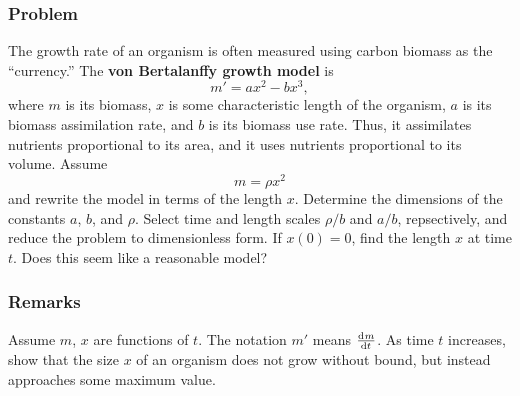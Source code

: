 \documentclass[12pt]{article}
\begin{document}
\subsubsection*{Problem}
The growth rate of an organism is often measured using carbon biomass as the
``currency.'' The \textbf{von Bertalanffy growth model} is
\begin{equation}
  \label{eq:growth-model}
  m' = ax^2 - bx^3,
\end{equation}
where $m$ is its biomass, $x$ is some characteristic length of the organism, $a$
is its biomass assimilation rate, and $b$ is its biomass use rate. Thus, it
assimilates nutrients proportional to its area, and it uses nutrients
proportional to its volume. Assume
\begin{equation}
  \label{eq:biomass-model}
  m=\rho x^2
\end{equation}
and rewrite the model in terms
of the length $x$. Determine the dimensions of the constants $a$, $b$, and
$\rho$. Select time and length scales $\rho/b$ and $a/b$, repsectively, and
reduce the problem to dimensionless form. If $x(0)=0$, find the length $x$ at
time $t$. Does this seem like a reasonable model?

\subsubsection*{Remarks}
Assume $m$, $x$ are functions of $t$. The notation $m'$ means $\frac{\mathrm{d}^{} {m}}{\mathrm{d}{t}^{}}$. As
time $t$ increases, show that the size $x$ of an organism does not grow without
bound, but instead approaches some maximum value.
\end{document}
